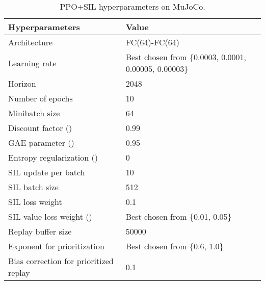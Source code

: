 \documentclass{article}
\begin{document}
\begin{table}[H]
\small
\centering
\caption{PPO+SIL hyperparameters on MuJoCo.}
\label{tab:hyper-ppo}
\begin{tabular}{l l}
\toprule
Hyperparameters & Value \\
\midrule
Architecture & FC(64)-FC(64) \\
Learning rate & Best chosen from \{0.0003, 0.0001, 0.00005, 0.00003\} \\
Horizon & 2048 \\
Number of epochs & 10 \\
Minibatch size & 64 \\
Discount factor () & 0.99 \\
GAE parameter () & 0.95 \\
Entropy regularization () & 0 \\
\midrule
SIL update per batch & 10 \\
SIL batch size & 512 \\
SIL loss weight & 0.1 \\
SIL value loss weight () & Best chosen from \{0.01, 0.05\} \\
Replay buffer size & 50000 \\
Exponent for prioritization & Best chosen from \{0.6, 1.0\} \\
Bias correction for prioritized replay & 0.1 \\
\bottomrule
\end{tabular}
\end{table}
\end{document}
